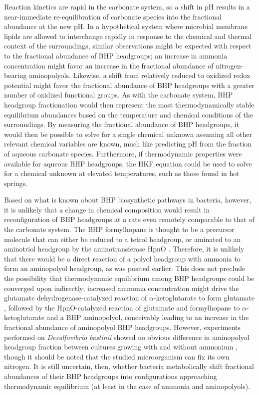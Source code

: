 Reaction kinetics are rapid in the carbonate system, so a shift in pH results in a near-immediate re-equilibration of carbonate species into the fractional abundance at the new pH. In a hypothetical system where microbial membrane lipids are allowed to interchange rapidly in response to the chemical and thermal context of the surroundings, similar observations might be expected with respect to the fractional abundance of BHP headgroups; an increase in ammonia concentration might favor an increase in the fractional abundance of nitrogen-bearing aminopolyols. Likewise, a shift from relatively reduced to oxidized redox potential might favor the fractional abundance of BHP headgroups with a greater number of oxidized functional groups. As with the carbonate system, BHP headgroup fractionation would then represent the most thermodynamically stable equilibrium abundances based on the temperature and chemical conditions of the surroundings. By measuring the fractional abundance of BHP headgroups, it would then be possible to solve for a single chemical unknown assuming all other relevant chemical variables are known, much like predicting pH from the fraction of aqueous carbonate species. Furthermore, if thermodynamic properties were available for aqueous BHP headgroups, the HKF equation could be used to solve for a chemical unknown at elevated temperatures, such as those found in hot springs.

Based on what is known about BHP biosynthetic pathways in bacteria, however, it is unlikely that a change in chemical composition would result in reconfiguration of BHP headgroups at a rate even remotely comparable to that of the carbonate system. The BHP formylhopane is thought to be a precursor molecule that can either be reduced to a tetrol headgroup, or aminated to an aminotriol headgroup by the aminotransferase HpnO \citep{welander2012identification}. Therefore, it is unlikely that there would be a direct reaction of a polyol headgroup with ammonia to form an aminopolyol headgroup, as was posited earlier. This does not preclude the possibility that thermodynamic equilibrium among BHP headgroups could be converged upon indirectly; increased ammonia concentration might drive the glutamate dehydrogenase-catalyzed reaction of $\alpha$-ketoglutarate to form glutamate \citep{lightfoot1988expression}, followed by the HpnO-catalyzed reaction of glutamate and formylhopane to $\alpha$-ketoglutarate and a BHP aminopolyol, conceivably leading to an increase in the fractional abundance of aminopolyol BHP headgroups. However, experiments performed on \textit{Desulfovibrio bastinii} showed no obvious difference in aminopolyol headgroup fraction between cultures growing with and without ammonium \citep{blumenberg2012novel}, though it should be noted that the studied microorganism can fix its own nitrogen. It is still uncertain, then, whether bacteria metabolically shift fractional abundances of their BHP headgroups into configurations approaching thermodynamic equilibrium (at least in the case of ammonia and aminopolyols).

